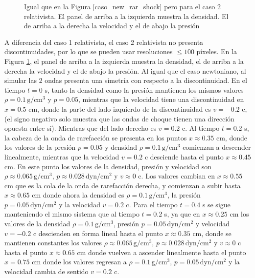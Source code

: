 \documentclass[12pt,a4paper]{book}
\begin{document}
\begin{figure}
    \caption{Igual que en la Figura \ref{caso_new_rar_shock} pero para el caso 2 relativista. 
    El panel de arriba a la izquierda muestra la densidad.
    El de arriba a la derecha la velocidad y el de abajo la presión}\label{caso_rel_shock_shock}
\end{figure}
A diferencia del caso 1 relativista, el caso 2 relativista no presenta discontinuidades,
por lo que se pueden usar resoluciones $\leq 100$ píxeles. En la Figura 
\ref{caso_rel_shock_shock},  
el panel de arriba a la izquierda muestra la densidad, el de arriba a la derecha la velocidad
y el de abajo la presión.
Al igual que el caso newtoniano, al simular las 2 ondas presenta una simetría con respecto a la 
discontinuidad.
En el tiempo $t = 0$ s, tanto la densidad como la presión mantienen los mismos valores 
$\rho =0.1 \,  \text{g}/ \text{cm}^3$
y $p = 0.05$, mientras que la velocidad tiene una discontinuidad en $x = 0.5$ cm, donde la parte del lado
izquierdo de la discontinuidad es $v = -0.2$ c,  (el signo negativo solo muestra que las ondas de choque
tienen una dirección opuesta entre sí). 
Mientras que del lado derecho es $v = 0.2$ c.
Al tiempo $t = 0.2$ s, la cabeza de la onda de rarefacción se presenta en los puntos 
$x \approx 0.35$ cm, donde los valores de la presión $p = 0.05$ y densidad 
$\rho =0.1 \,  \text{g}/ \text{cm}^3$ comienzan a descender linealmente,
mientras que la velocidad $v = 0.2$ c desciende hasta el punto $x \approx 0.45$ cm. En este punto los valores de la densidad, presión y velocidad
son $\rho \approx 0.065 \,  \text{g}/ \text{cm}^3$, $p \approx 0.028\,  \text{dyn}/ \text{cm}^2 $ 
y $v \approx 0$ c. Los valores cambian en 
$ x \approx 0.55$ cm
que es la cola de la onda de rarefacción derecha, y comienzan a subir
hasta $x \approx 0.65$ cm donde ahora la densidad es 
$\rho = 0.1 \,  \text{g}/ \text{cm}^3$, la presión $p = 0.05 \,  \text{dyn}/ \text{cm}^2 $ y 
la velocidad $v = 0.2$ c.
Para el tiempo $t = 0.4$ s se sigue manteniendo el mismo sistema que al tiempo $t =0.2$ s, ya que en
$x \approx 0.25$ cm los valores de la densidad $\rho = 0.1 \,  \text{g}/ \text{cm}^3$, 
presión $p = 0.05 \,  \text{dyn}/ \text{cm}^2 $ 
y velocidad $v = -0.2$ c descienden en forma lineal hasta el punto $x \approx 0.35$ cm, donde 
se mantienen constantes los valores $\rho \approx 0.065  \,  \text{g}/ \text{cm}^3$, 
$p \approx 0.028\,  \text{dyn}/ \text{cm}^2 $ y $v \approx 0$ c 
hasta el punto $x \approx 0.65$ cm donde vuelven a ascender linealmente
hasta el punto $x = 0.75$ cm donde los valores regresan a $\rho = 0.1 \,  \text{g}/ \text{cm}^3$, 
$p = 0.05 \,  \text{dyn}/ \text{cm}^2 $ y la velocidad 
cambia de sentido $v = 0.2$ c.
\end{document}

